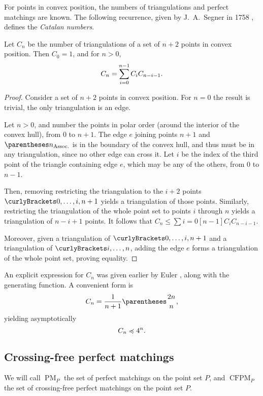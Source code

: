 \documentclass[10pt, a4paper, twoside]{basestyle}
\DeclareMathOperator{\PM}{PM}
\DeclareMathOperator{\CFPM}{CFPM}
\begin{document}
For points in convex position, the numbers of triangulations and perfect matchings are known.
The following recurrence, given by J.~A.~Segner in 1758 \cite{Segner1758}, defines the \emph{Catalan numbers}.
\begin{theorem}[Segner]
Let $C_n$ be the number of triangulations of a set of $n+2$ points in convex position.
Then $C_0 = 1$, and for $n>0$, \begin{equation}
C_n = \sum {i=0}[n-1] C_i C_{n-i-1}\text. \label{CatalanRecurrence}
\end{equation}
\begin{proof}
Consider a set of $n+2$ points in convex position.
For $n=0$ the result is trivial, the only triangulation is an edge.

Let $n > 0$, and number the points in polar order (around the interior of the convex hull), from $0$ to $n+1$.
The edge $e$ joining points $n+1$ and $\pa{n}$ is in the boundary of the convex hull, and thus must
be in any triangulation, since no other edge can cross it. Let $i$ be the index of the third point of the
triangle containing edge $e$, which may be any of the others, from $0$ to $n-1$.

Then, removing restricting the triangulation to the $i+2$ points $\set{0,\dotsc,i,n+1}$ yields a triangulation
of those points.
Similarly, restricting the triangulation of the whole point set to points $i$ through $n$ yields a triangulation of
$n-i+1$ points. It follows that $C_n \leq \sum {i=0}[n-1] C_i C_{n-i-1}$.

Moreover, given a triangulation of $\set{0,\dotsc,i,n+1}$ and a triangulation of $\set{i,\dotsc, n}$,
adding the edge $e$ forms a triangulation of the whole point set, proving equality.
\end{proof}
\end{theorem}
An explicit expression for $C_n$ was given earlier by Euler \cite{Euler1751}, along
with the generating function.
A convenient form is\begin{equation}
C_n = \frac{1}{n+1} \binom {2n} {n}\text,
\end{equation}
yielding asymptotically
\begin{equation}
C_n \preccurlyeq 4^n\text.
\end{equation}

\subsection{Crossing-free perfect matchings}
\label{PerfectMatchingsIntro}
We will call $\PM_P$ the set of perfect matchings on the point set $P$, and $\CFPM_P$ the set
of crossing-free perfect matchings on the point set $P$.
\end{document}
